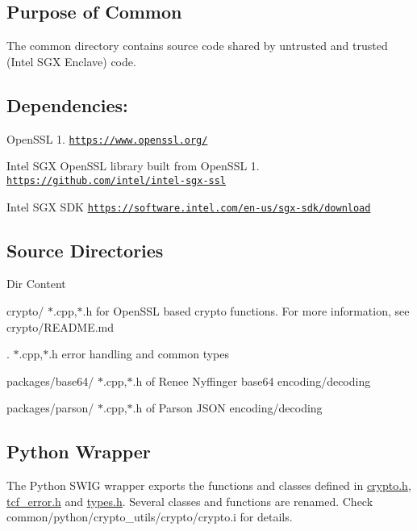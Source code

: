 \subsection*{Purpose of Common }

The common directory contains source code shared by untrusted and trusted (Intel S\+GX Enclave) code.

\subsection*{Dependencies\+: }


\begin{DoxyEnumerate}
\item Open\+S\+SL 1. \href{https://www.openssl.org/}{\tt https\+://www.\+openssl.\+org/}
\item Intel S\+GX Open\+S\+SL library built from Open\+S\+SL 1. \href{https://github.com/intel/intel-sgx-ssl}{\tt https\+://github.\+com/intel/intel-\/sgx-\/ssl}
\item Intel S\+GX S\+DK \href{https://software.intel.com/en-us/sgx-sdk/download}{\tt https\+://software.\+intel.\+com/en-\/us/sgx-\/sdk/download}
\end{DoxyEnumerate}

\subsection*{Source Directories }

Dir Content 

 {\ttfamily crypto/} $\ast$.cpp,$\ast$.h for Open\+S\+SL based crypto functions. For more information, see crypto/\+R\+E\+A\+D\+ME.md

{\ttfamily .} $\ast$.cpp,$\ast$.h error handling and common types

{\ttfamily packages/base64/} $\ast$.cpp,$\ast$.h of Renee Nyffinger base64 encoding/decoding

{\ttfamily packages/parson/} $\ast$.cpp,$\ast$.h of Parson J\+S\+ON encoding/decoding

\subsection*{Python Wrapper }

The Python S\+W\+IG wrapper exports the functions and classes defined in \hyperlink{crypto_8h_source}{crypto.\+h}, \hyperlink{tcf__error_8h}{tcf\+\_\+error.\+h} and \hyperlink{types_8h}{types.\+h}. Several classes and functions are renamed. Check {\ttfamily common/python/crypto\+\_\+utils/crypto/crypto.\+i} for details. 